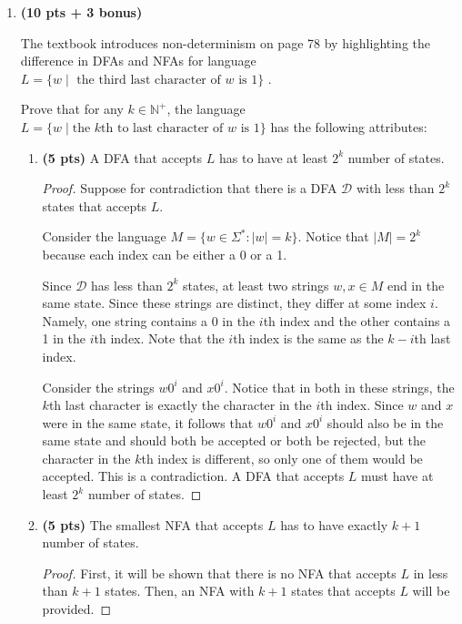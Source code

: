 \documentclass[11pt]{article}
\begin{document}
\begin{enumerate}[label=\textbf{Q\arabic*.}]
\begin{enumerate}[label=\textit{\alph*)}]
\begin{proof}
	\end{proof}

\end{enumerate}


(Continued on the next page)

\newpage

\item \textbf{(10 pts + 3 bonus)}

The textbook introduces non-determinism on page 78 by highlighting the difference in DFAs and NFAs for language $L = \{w \mid \text{ the third last character of } w \text{ is } 1\}$ . 

Prove that for any $k\in \mathbb{N}^+$, the language $L = \{ w \mid \text{the } k\text{th to last character of } w \text{ is } 1\}$ has the following attributes:


\begin{enumerate}[label=\textit{\alph*)}]
\item \textbf{(5 pts)} A DFA that accepts $L$ has to have at least $2^k$ number of states.
\begin{proof}
	Suppose for contradiction that there is a DFA \(\mathcal{D}\) with less than \(2^k\) states that accepts \(L\).

	Consider the language \(M = \{w \in \Sigma ^* : |w| = k\}\). Notice that \(|M| = 2^k\) because each index can be either a 0 or a 1.

	Since \(\mathcal{D}\) has less than \(2^k\) states, at least two strings \(w,x \in M\) end in the same state. Since these strings are distinct, they differ at some index \(i\). Namely, one string contains a 0 in the \(i\)th index and the other contains a 1 in the \(i\)th index. Note that the \(i\)th index is the same as the \(k-i\)th last index.

	Consider the strings \(w0^i\) and \(x0^i\). Notice that in both in these strings, the \(k\)th last character is exactly the character in the \(i\)th index. Since \(w\) and \(x\) were in the same state, it follows that \(w0^i\) and \(x0^i\) should also be in the same state and should both be accepted or both be rejected, but the character in the \(k\)th index is different, so only one of them would be accepted. This is a contradiction. A DFA that accepts \(L\) must have at least \(2^k\) number of states.
	\smallbreak
\end{proof}

\item \textbf{(5 pts)} The smallest NFA that accepts $L$ has to have exactly $k + 1$ number of states.
\begin{proof}
	First, it will be shown that there is no NFA that accepts \(L\) in less than \(k+1\) states. Then, an NFA with \(k+1\) states that accepts \(L\) will be provided.
	

\end{proof}
\end{enumerate}
\end{enumerate}
\end{document}
